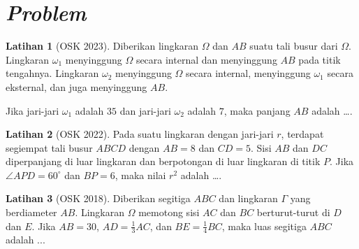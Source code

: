 \documentclass[aspectratio=169]{beamer}
\theoremstyle{definition}
\newtheorem{latihan}{Latihan}
\begin{document}
\section*{\textit{Problem}}
\begin{frame}{\insertsection}
  \begin{latihan}[OSK 2023]
    Diberikan lingkaran $\Omega$ dan $AB$ suatu tali busur dari $\Omega$.
    Lingkaran $\omega_1$ menyinggung $\Omega$ secara internal dan menyinggung
    $AB$ pada titik tengahnya. Lingkaran $\omega_2$ menyinggung $\Omega$
    secara internal, menyinggung $\omega_1$ secara eksternal, dan juga
    menyinggung $AB$.

    \begin{center}
    \end{center}
    Jika jari-jari $\omega_1$ adalah $35$ dan jari-jari $\omega_2$
    adalah $7$, maka panjang $AB$ adalah \ldots.
  \end{latihan}
\end{frame}

\begin{frame}{\insertsection}
  \begin{latihan}[OSK 2022]
    Pada suatu lingkaran dengan jari-jari $r$, terdapat segiempat tali busur $ABCD$ dengan $AB=8$ dan $CD=5$. Sisi $AB$ dan $DC$ diperpanjang di luar lingkaran dan berpotongan di luar lingkaran di titik $P$. Jika $\angle APD=60^\circ$ dan $BP=6$, maka nilai $r^2$ adalah \ldots.
  \end{latihan}
  \begin{latihan}[OSK 2018]
    Diberikan segitiga $ABC$ dan lingkaran $\Gamma$ yang berdiameter $AB$. Lingkaran $\Omega$ memotong sisi $AC$ dan $BC$ berturut-turut di $D$ dan $E$. Jika $AB = 30$, $AD = \frac{1}{3}AC$, dan $BE = \frac{1}{4}BC$, maka luas segitiga $ABC$ adalah ...
  \end{latihan}
\end{frame}
\end{document}
